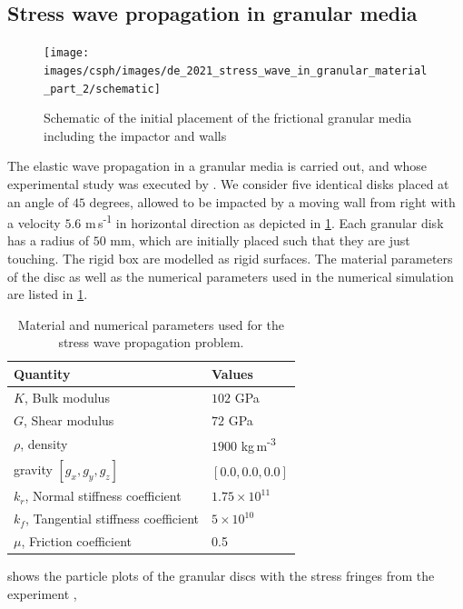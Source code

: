 \subsection{Stress wave propagation in granular media}
\label{sec:results-stress-wave-propagation-with-friction}
\begin{figure}[!htpb]
  \centering
  \texttt{[image: images/csph/images/de\_2021\_stress\_wave\_in\_granular\_material\_part\_2/schematic]}
  \caption{Schematic of the initial placement of the frictional granular media including the impactor and walls}
\label{fig:results-stress-wave-propagation-part-II}
\end{figure}
The elastic wave propagation in a granular media is carried out, and whose
experimental study was executed by \cite{guilkey2001improved}. We consider five
identical disks placed at an angle of $45$ degrees, allowed to be impacted by a
moving wall from right with a velocity $5.6$ m\,s\textsuperscript{-1} in
horizontal direction as depicted in
\cref{fig:results-stress-wave-propagation-part-II}. Each granular disk has a
radius of $50$ mm, which are initially placed such that they are just touching.
The rigid box are modelled as rigid surfaces. The material parameters of
the disc as well as the numerical parameters used in the numerical simulation
are listed in \cref{tab:de-stress-part-2-params}.
\begin{table}[!ht]
  \centering
  \begin{tabular}[!ht]{ll}
    \toprule
    Quantity & Values\\
    \midrule
    $K$, Bulk modulus & $102$ GPa \\
    $G$, Shear modulus & $72$ GPa \\
    $\rho$, density & $1900$ kg\,m\textsuperscript{-3} \\
    gravity $[g_x, g_y, g_z]$ & $[0.0, 0.0, 0.0]$\\
    $k_r$, Normal stiffness coefficient & $1.75 \times 10^{11}$ \\
    $k_f$, Tangential stiffness coefficient & $5 \times 10^{10}$ \\
    $\mu$, Friction coefficient & 0.5 \\
    \bottomrule
  \end{tabular}
  \caption{Material and numerical parameters used for the stress wave propagation problem.}%
  \label{tab:de-stress-part-2-params}
\end{table}
 shows the particle plots of the granular
discs with the stress fringes from the experiment \citep{guilkey2001improved},

